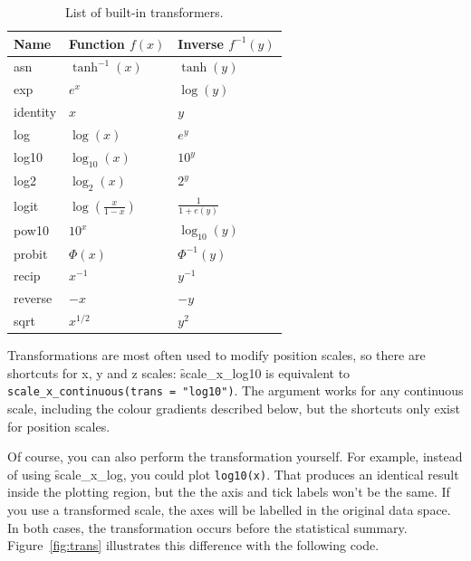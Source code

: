 \begin{table}
  \centering
  \begin{tabular}{lll}
    \toprule
    Name & Function $f(x)$ & Inverse $f^{-1}(y)$ \\
    \midrule
    asn       & $\tanh^{-1}(x)$ & $\tanh(y)$ \\
    exp       & $e ^ x$         & $\log(y)$  \\
    identity  & $x$             & $y$        \\
    log       & $\log(x)$       & $e ^ y$    \\
    log10     & $\log_{10}(x)$  & $10 ^ y$   \\
    log2      & $\log_2(x)$     & $2 ^ y$    \\
    logit     & $\log(\frac{x}{1 - x})$ & $\frac{1}{1 + e(y)} $ \\
    pow10     & $10^x$          & $\log_{10}(y) $ \\
    probit    & $\Phi(x)$       & $\Phi^{-1}(y)$ \\
    recip     & $x^{-1}$        & $y^{-1}$ \\
    reverse   & $-x$            & $-y$     \\
    sqrt      & $x^{1/2}$       & $y ^ 2$  \\
    \bottomrule
  \end{tabular}
  \caption{List of built-in transformers.}
  \label{tbl:common-trans}
\end{table}

Transformations are most often used to modify position scales, so there are shortcuts for x, y and z scales: \f{scale_x_log10} is equivalent to \verb|scale_x_continuous(trans = "log10")|.  The  argument works for any continuous scale, including the colour gradients described below, but the shortcuts only exist for position scales.

Of course, you can also perform the transformation yourself. For example, instead of using \f{scale_x_log}, you could plot {\tt log10(x)}. That produces an identical result inside the plotting region, but the the axis and tick labels won't be the same. If you use a transformed scale, the axes will be labelled in the original data space. In both cases, the transformation occurs before the statistical summary. Figure~\ref{fig:trans} illustrates this difference with the following code.

% 


